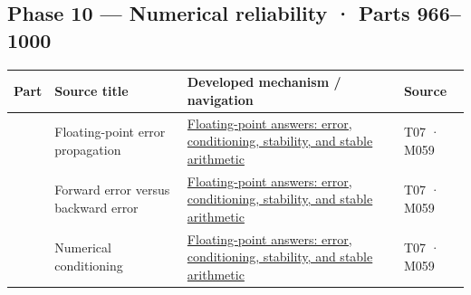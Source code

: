 \subsection{Phase 10 --- Numerical reliability · Parts 966--1000}\label{phase-10-numerical-reliability-parts-9661000}

{\def\LTcaptype{none} %
\begin{longtable}[]{@{}
  >{\raggedleft\arraybackslash}p{}
  >{\raggedright\arraybackslash}p{}
  >{\raggedright\arraybackslash}p{}
  >{\raggedright\arraybackslash}p{}@{}}
\toprule\noalign{}
\begin{minipage}[b]{\linewidth}\raggedleft
Part
\end{minipage} & \begin{minipage}[b]{\linewidth}\raggedright
Source title
\end{minipage} & \begin{minipage}[b]{\linewidth}\raggedright
Developed mechanism / navigation
\end{minipage} & \begin{minipage}[b]{\linewidth}\raggedright
Source
\end{minipage} \\
\midrule\noalign{}
\endhead
\bottomrule\noalign{}
\endlastfoot
966 & Floating-point error propagation & \href{Continuous\%20Notes/Computing\%20Foundations\%20-\%20From\%20Bits\%20to\%20C++\%20and\%20Systems\%20APIs\#Floating-point\%20answers:\%20error,\%20conditioning,\%20stability,\%20and\%20stable\%20arithmetic/}{Floating-point answers: error, conditioning, stability, and stable arithmetic} & T07 · M059 \\
967 & Forward error versus backward error & \href{Continuous\%20Notes/Computing\%20Foundations\%20-\%20From\%20Bits\%20to\%20C++\%20and\%20Systems\%20APIs\#Floating-point\%20answers:\%20error,\%20conditioning,\%20stability,\%20and\%20stable\%20arithmetic/}{Floating-point answers: error, conditioning, stability, and stable arithmetic} & T07 · M059 \\
968 & Numerical conditioning & \href{Continuous\%20Notes/Computing\%20Foundations\%20-\%20From\%20Bits\%20to\%20C++\%20and\%20Systems\%20APIs\#Floating-point\%20answers:\%20error,\%20conditioning,\%20stability,\%20and\%20stable\%20arithmetic/}{Floating-point answers: error, conditioning, stability, and stable arithmetic} & T07 · M059 \\

\end{longtable}}
